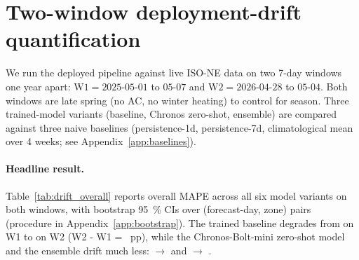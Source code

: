 
\section{Two-window deployment-drift quantification}
\label{sec:drift}

We run the deployed pipeline against live ISO-NE data on two 7-day
windows one year apart: $\mathrm{W1} = 2025\text{-}05\text{-}01$ to
$05\text{-}07$ and $\mathrm{W2} = 2026\text{-}04\text{-}28$ to
$05\text{-}04$. Both windows are late spring (no AC, no winter heating)
to control for season. Three trained-model variants (baseline, Chronos
zero-shot, ensemble) are compared against three naive baselines
(persistence-1d, persistence-7d, climatological mean over 4 weeks; see
Appendix~\ref{app:baselines}).

\paragraph{Headline result.}
Table~\ref{tab:drift_overall} reports overall MAPE across all six
model variants on both windows, with bootstrap 95~\% CIs over
(forecast-day, zone) pairs (procedure in Appendix~\ref{app:bootstrap}).
The trained baseline degrades from \PHWONEBASELINE{} on W1 to
\PHWTWOBASELINE{} on W2 (W2 - W1 = \PHDIFFBASELINE{}~pp), while the
Chronos-Bolt-mini zero-shot model and the ensemble drift much less:
\PHWONECHRONOS{} $\to$ \PHWTWOCHRONOS{} and
\PHWONEENSEMBLE{} $\to$ \PHWTWOENSEMBLE{}.

